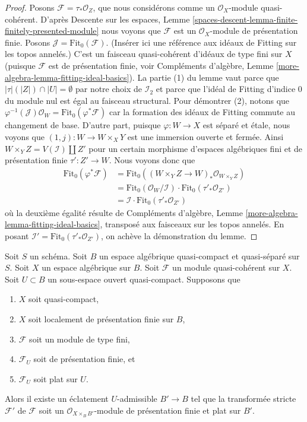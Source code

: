 \begin{proof}
\medskip\noindent
Posons $\mathcal{F} = \tau_*\mathcal{O}_Z$, que nous considérons comme
un $\mathcal{O}_X$-module quasi-cohérent. D'après
Descente sur les espaces, Lemme
\ref{spaces-descent-lemma-finite-finitely-presented-module}
nous voyons que $\mathcal{F}$ est un $\mathcal{O}_X$-module de présentation finie.
Posons $\mathcal{J} = \text{Fit}_0(\mathcal{F})$. (Insérer ici une référence aux
idéaux de Fitting sur les topos annelés.) C'est un faisceau quasi-cohérent
d'idéaux de type fini sur $X$ (puisque $\mathcal{F}$ est de présentation finie, voir
Compléments d'algèbre, Lemme \ref{more-algebra-lemma-fitting-ideal-basics}).
La partie (1) du lemme vaut parce que $|\tau|(|Z|) \cap |U| = \emptyset$
par notre choix de $\mathcal{I}_2$ et parce que l'idéal de Fitting d'indice $0$
du module nul est égal au faisceau structural. Pour démontrer (2), notons que
$\varphi^{-1}(\mathcal{J})\mathcal{O}_W = \text{Fit}_0(\varphi^*\mathcal{F})$
car la formation des idéaux de Fitting commute au changement de base.
D'autre part, puisque $\varphi : W \to X$ est séparé et étale,
nous voyons que $(1, j) : W \to W \times_X Y$ est une immersion ouverte et fermée.
Ainsi $W \times_Y Z = V(\mathcal{I}) \amalg Z'$ pour un certain morphisme d'espaces
algébriques fini et de présentation finie $\tau' : Z' \to W$.
Nous voyons donc que
\begin{align*}
\text{Fit}_0(\varphi^*\mathcal{F}) & =
\text{Fit}_0((W \times_Y Z \to W)_*\mathcal{O}_{W \times_Y Z}) \\
& =
\text{Fit}_0(\mathcal{O}_W/\mathcal{I}) \cdot
\text{Fit}_0(\tau'_*\mathcal{O}_{Z'}) \\
& =
\mathcal{I} \cdot \text{Fit}_0(\tau'_*\mathcal{O}_{Z'})
\end{align*}
où la deuxième égalité résulte de
Compléments d'algèbre, Lemme \ref{more-algebra-lemma-fitting-ideal-basics},
transposé aux faisceaux sur les topos annelés.
En posant $\mathcal{I}' = \text{Fit}_0(\tau'_*\mathcal{O}_{Z'})$,
on achève la démonstration du lemme.
\end{proof}

\begin{theorem}
\label{theorem-flatten-module}
Soit $S$ un schéma. Soit $B$ un espace algébrique quasi-compact et quasi-séparé
sur $S$. Soit $X$ un espace algébrique sur $B$.
Soit $\mathcal{F}$ un module quasi-cohérent sur $X$.
Soit $U \subset B$ un sous-espace ouvert quasi-compact. Supposons que
\begin{enumerate}
\item $X$ soit quasi-compact,
\item $X$ soit localement de présentation finie sur $B$,
\item $\mathcal{F}$ soit un module de type fini,
\item $\mathcal{F}_U$ soit de présentation finie, et
\item $\mathcal{F}_U$ soit plat sur $U$.
\end{enumerate}
Alors il existe un éclatement $U$-admissible $B' \to B$ tel que la
transformée stricte $\mathcal{F}'$ de $\mathcal{F}$ soit un
$\mathcal{O}_{X \times_B B'}$-module de présentation finie et
plat sur $B'$.
\end{theorem}


